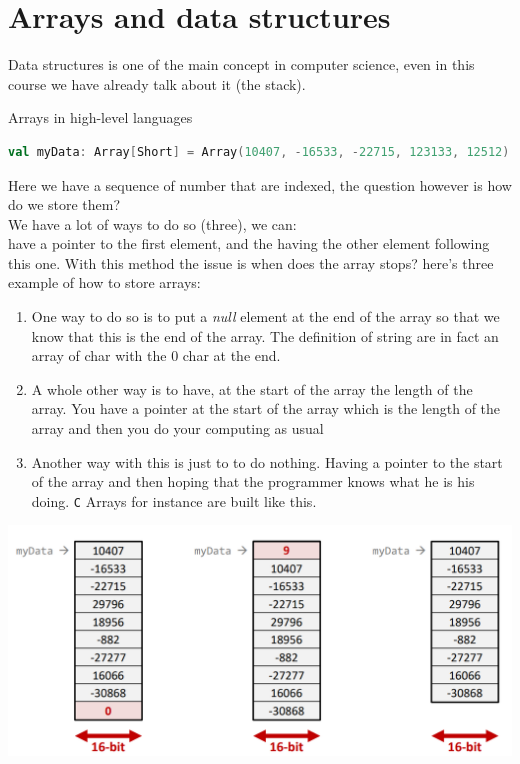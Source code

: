 \section{Arrays and data structures}
Data structures is one of the main concept in computer science, even in this course we have already talk about it (the stack).\\
\begin{parag}{Arrays in high-level languages}
	\begin{lstlisting}[language=Scala]
val myData: Array[Short] = Array(10407, -16533, -22715, 123133, 12512)
    \end{lstlisting}
Here we have a sequence of number that are indexed, the question however is how do we store them?\\
We have a lot of ways to do so (three), we can:\\
have a pointer to the first element, and the having the other element following this one. With this method the issue is when does the array stops? here's three example of how to store arrays:
\begin{enumerate}
    \item One way to do so is to put a \textit{null} element at the end of the array so that we know that this is the end of the array.  The definition of string are in fact an array of char with the 0 char at the end.
	\item A whole other way is to have, at the start of the array the length of the array. You have a pointer at the start of the array which is the length of the array and then you do your computing as usual
	\item Another way with this is just to to do nothing. Having a pointer to the start of the array and then hoping that the programmer knows what he is his doing. \texttt{C} Arrays for instance are built like this.
\end{enumerate}


\end{parag}
\begin{center}
\includegraphics[scale=0.3]{screenshots/2025-10-21.png}
\end{center}
